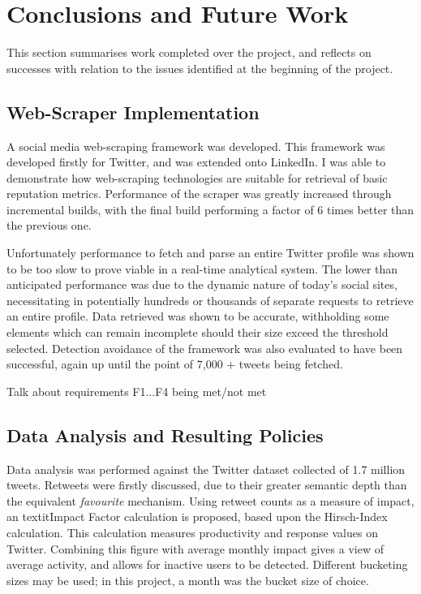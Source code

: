 \chapter{Conclusions and Future Work}\label{C:us}



This section summarises work completed over the project, and reflects on successes with relation to the issues identified at the beginning of the project.


\section{Web-Scraper Implementation}

A social media web-scraping framework was developed. This framework was developed firstly for Twitter, and was extended onto LinkedIn. I was able to demonstrate how web-scraping technologies are suitable for retrieval of basic reputation metrics. Performance of the scraper was greatly increased through incremental builds, with the final build performing a factor of 6 times better than the previous one.

Unfortunately performance to fetch and parse an entire Twitter profile was shown to be too slow to prove viable in a real-time analytical system. The lower than anticipated performance was due to the dynamic nature of today's social sites, necessitating in potentially hundreds or thousands of separate requests to retrieve an entire profile. Data retrieved was shown to be accurate, withholding some elements which can remain incomplete should their size exceed the threshold selected. Detection avoidance of the framework was also evaluated to have been successful, again up until the point of 7,000 + tweets being fetched. 

Talk about requirements F1...F4 being met/not met

\section{Data Analysis and Resulting Policies}

Data analysis was performed against the Twitter dataset collected of 1.7 million tweets. Retweets were firstly discussed, due to their greater semantic depth than the equivalent \textit{favourite} mechanism. Using retweet counts as a measure of impact, an textit{Impact Factor} calculation is proposed, based upon the Hirsch-Index calculation. This calculation measures productivity and response values on Twitter. Combining this figure with average monthly impact gives a view of average activity, and allows for inactive users to be detected. Different bucketing sizes may be used; in this project, a month was the bucket size of choice. 

